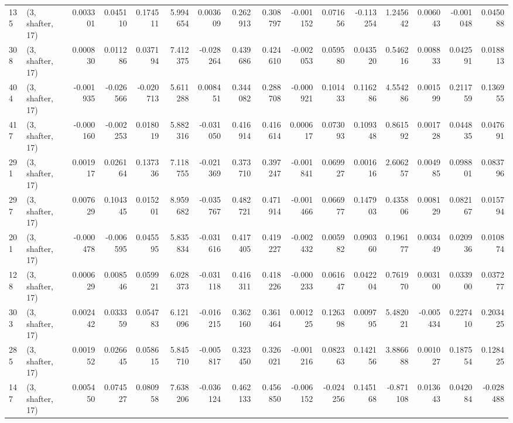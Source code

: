 \begin{tabular}{llrrrrrrrrrrrrrr}
135 &  (3, shafter, 17) &   0.003301 &  0.045110 &  0.174511 &    5.994654 &  0.003609 &   0.262913 &  0.308797 & -0.001152 &  0.071656 & -0.113254 &    1.245642 &  0.006043 & -0.001048 &  0.045088 \\
308 &  (3, shafter, 17) &   0.000830 &  0.011286 &  0.037194 &    7.412375 & -0.028264 &   0.439686 &  0.424610 & -0.002053 &  0.059580 &  0.043520 &    0.546216 &  0.008833 &  0.042591 &  0.018813 \\
404 &  (3, shafter, 17) &  -0.001935 & -0.026566 & -0.020713 &    5.611288 &  0.008451 &   0.344082 &  0.288708 & -0.000921 &  0.101433 &  0.116286 &    4.554286 &  0.001599 &  0.211759 &  0.136955 \\
417 &  (3, shafter, 17) &  -0.000160 & -0.002253 &  0.018019 &    5.882316 & -0.031050 &   0.416914 &  0.416614 &  0.000617 &  0.073093 &  0.109348 &    0.861592 &  0.001728 &  0.044835 &  0.047691 \\
291 &  (3, shafter, 17) &   0.001917 &  0.026164 &  0.137336 &    7.118755 & -0.021369 &   0.373710 &  0.397247 & -0.001841 &  0.069927 &  0.001616 &    2.606257 &  0.004985 &  0.098801 &  0.083796 \\
297 &  (3, shafter, 17) &   0.007629 &  0.104345 &  0.015201 &    8.959682 & -0.035767 &   0.482721 &  0.471914 & -0.001466 &  0.066977 &  0.147903 &    0.435806 &  0.008129 &  0.082167 &  0.015794 \\
201 &  (3, shafter, 17) &  -0.000478 & -0.006595 &  0.045595 &    5.835834 & -0.031616 &   0.417405 &  0.419227 & -0.002432 &  0.005982 &  0.090360 &    0.196177 &  0.003449 &  0.020936 &  0.010874 \\
128 &  (3, shafter, 17) &   0.000629 &  0.008546 &  0.059921 &    6.028373 & -0.031118 &   0.416311 &  0.418226 & -0.000233 &  0.061647 &  0.042204 &    0.761970 &  0.003100 &  0.033900 &  0.037277 \\
303 &  (3, shafter, 17) &   0.002442 &  0.033359 &  0.054783 &    6.121096 & -0.016215 &   0.362160 &  0.361464 &  0.001225 &  0.126398 &  0.009795 &    5.482021 & -0.005434 &  0.227410 &  0.203425 \\
285 &  (3, shafter, 17) &   0.001952 &  0.026645 &  0.058615 &    5.845710 & -0.005817 &   0.323450 &  0.326021 & -0.001216 &  0.082363 &  0.142156 &    3.886688 &  0.001027 &  0.187554 &  0.128425 \\
147 &  (3, shafter, 17) &   0.005450 &  0.074527 &  0.080958 &    7.638206 & -0.036124 &   0.462133 &  0.456850 & -0.006152 & -0.024256 &  0.145168 &   -0.871108 &  0.013643 &  0.042084 & -0.028488 \\

\end{tabular}

